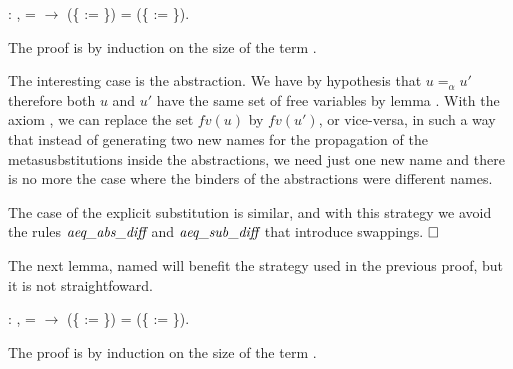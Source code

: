 \begin{coqdoccode}
\coqdocemptyline
\coqdocnoindent
{} : \coqdockw{\ensuremath{\forall}}    ,  =  \ensuremath{\rightarrow} (\{ := \}) = (\{ := \}).\coqdoceol
\end{coqdoccode}
 The proof is by induction on the size of the term .
\begin{coqdoccode}
\end{coqdoccode}
The interesting case is the abstraction. We have by hypothesis that $u =_\alpha u'$ therefore both $u$ and $u'$ have the same set of free variables by lemma . With the axiom , we can replace the set $fv(u)$ by $fv(u')$, or vice-versa, in such a way that instead of generating two new names for the propagation of the metasusbstitutions inside the abstractions, we need just one new name and there is no more the case where the binders of the abstractions were different names. 
\begin{coqdoccode}
\end{coqdoccode}
The case of the explicit substitution is similar, and with this strategy we avoid the rules $\mbox{\it aeq}\_\mbox{\it abs}\_\mbox{\it diff}$ and $\mbox{\it aeq}\_\mbox{\it sub}\_\mbox{\it diff}$ that introduce swappings. $\hfill\Box$
\begin{coqdoccode}
\end{coqdoccode}
\newline 
\begin{coqdoccode}
\coqdocemptyline
\coqdocemptyline
\end{coqdoccode}
The next lemma, named  will benefit the strategy used in the previous proof, but it is not straightfoward.
\begin{coqdoccode}
\coqdocemptyline
\coqdocnoindent
{} : \coqdockw{\ensuremath{\forall}}    ,  =  \ensuremath{\rightarrow} (\{ := \}) = (\{ := \}).\coqdoceol
\end{coqdoccode}
 The proof is by induction on the size of the term . 
\begin{coqdoccode}
\end{coqdoccode}
